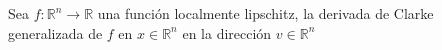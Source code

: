 \begin{exampletwoup}
	\begin{definition}
		Sea $f\colon\mathbb{R}^{n}\to\mathbb{R}$ una función localmente
		lipschitz, la derivada de Clarke generalizada de $f$ en
		$x\in\mathbb{R}^{n}$ en la dirección $v\in\mathbb{R}^{n}$
	\end{definition}
\end{exampletwoup}
